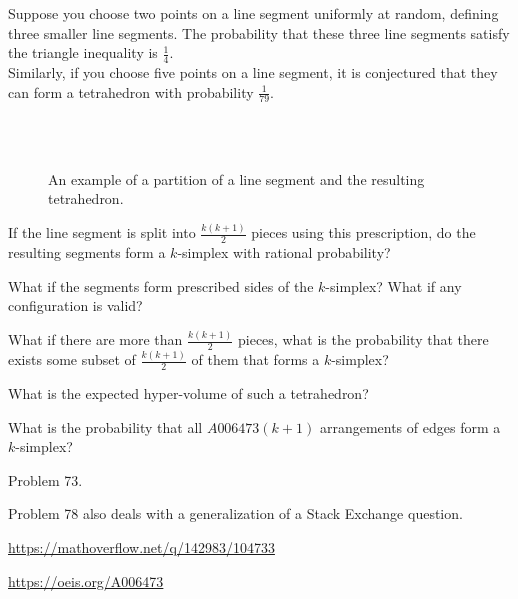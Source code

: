 \documentclass{article}
\begin{document}
  Suppose you choose two points on a line segment uniformly at random, defining
  three smaller line segments. The probability that these three line segments
  satisfy the triangle inequality is $\frac 14$.
  \\
  Similarly, if you choose five points on a line segment, it is conjectured that
  they can form a tetrahedron with probability $\frac 1{79}$.
\begin{figure}[ht!]
  \centering
  \\~\\
  \caption{
    An example of a partition of a line segment and the resulting tetrahedron.
  }
\end{figure}

\begin{question}
  If the line segment is split into $\frac{k(k+1)}{2}$ pieces using this
  prescription, do the resulting segments form a $k$-simplex with rational
  probability?
\end{question}

\begin{related}
  \item What if the segments form prescribed sides of the $k$-simplex? What if
    any configuration is valid?
  \item What if there are more than $\frac{k(k+1)}{2}$ pieces, what is the
    probability that there exists some subset of $\frac{k(k+1)}{2}$ of them that
    forms a $k$-simplex?
  \item What is the expected hyper-volume of such a tetrahedron?
  \item What is the probability that all $A006473(k+1)$ arrangements of edges
    form a $k$-simplex?
\end{related}

\begin{references}
  \item Problem 73.
  \item Problem 78 also deals with a generalization of a Stack Exchange question.
  \item \url{https://mathoverflow.net/q/142983/104733}
  \item \url{https://oeis.org/A006473}
\end{references}
\end{document}

